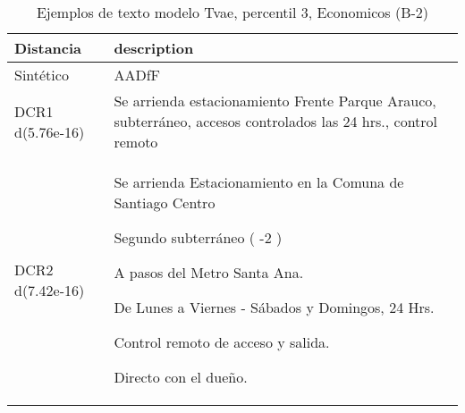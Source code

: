 \begin{table}[H]
\centering
\fontsize{10}{14}\selectfont
\caption{Ejemplos de texto modelo Tvae, percentil 3, Economicos (B-2)}
\label{table-example-economicos-b-2-tvae-3p-text}
\begin{tabular}{|l|m{35em}|}
\hline
\rowcolor[gray]{0.8}
Distancia & description \\
\hline Sintético & AADfF \\
\hline DCR1 d(5.76e-16) & Se arrienda estacionamiento Frente Parque Arauco, subterr\'aneo, accesos controlados las 24 hrs., control remoto \\
\hline DCR2 d(7.42e-16) & Se arrienda Estacionamiento en la Comuna de Santiago Centro

Segundo subterr\'aneo ( -2 )

A pasos del Metro Santa Ana.


De Lunes a Viernes - S\'abados y Domingos, 24 Hrs.

Control remoto de acceso y salida.

Directo con el due\~no. \\
\hline
\end{tabular}
\end{table}
